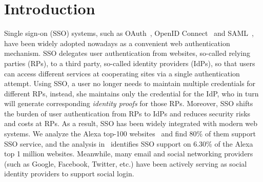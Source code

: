 \section{Introduction}
\label{sec:intro}

Single sign-on (SSO) systems, such as OAuth~\cite{rfc6749}, OpenID Connect~\cite{OpenIDConnect} and SAML~\cite{SAML}, have been widely adopted nowadays as a convenient web authentication mechanism. SSO delegates user authentication from websites, so-called relying parties (RPs), to a third party, so-called identity providers (IdPs), so that users can access different services at cooperating sites via a single authentication attempt. Using SSO, a user no longer needs to maintain multiple credentials for different RPs, instead, she maintains only the credential for the IdP, who in turn will generate corresponding \emph{identity proofs} for those RPs. Moreover, SSO shifts the burden of user authentication from RPs to IdPs and reduces security risks and costs at RPs. As a result, SSO has been widely integrated with modern web systems.
We analyze the Alexa top-100 websites~\cite{Alexa} and find 80\% of them support SSO service,
 and the analysis in~\cite{GhasemisharifRC18} identifies SSO support on 6.30\% of the Alexa top 1 million websites.
Meanwhile, many email and social networking providers (such as Google, Facebook, Twitter, etc.) have been actively serving as social identity providers to support social login.


